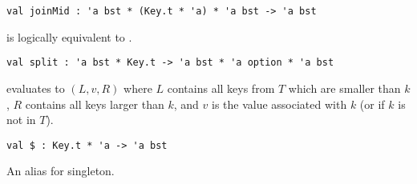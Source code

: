 \begin{gram}[joinMid]
\begin{verbatim}
val joinMid : 'a bst * (Key.t * 'a) * 'a bst -> 'a bst
\end{verbatim}
 is logically equivalent to
.
\end{gram}

\begin{gram}[split]
\begin{verbatim}
val split : 'a bst * Key.t -> 'a bst * 'a option * 'a bst
\end{verbatim}
 evaluates to $(L,v,R)$ where $L$ contains all keys from $T$
which are smaller than $k$, $R$ contains all keys larger than
$k$, and $v$ is the value associated with $k$ (or  if $k$ is not
in $T$).
\end{gram}

\begin{gram}[\$]
\begin{verbatim}
val $ : Key.t * 'a -> 'a bst
\end{verbatim}
An alias for singleton.
\end{gram}

